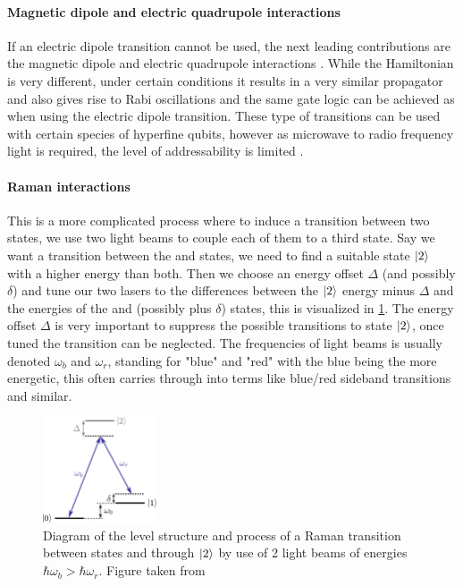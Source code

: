 \paragraph{Magnetic dipole and electric quadrupole interactions}
If an electric dipole transition cannot be used, the next leading contributions are the magnetic dipole and electric quadrupole interactions \cite{schaferFastGatesMixedSpecies2020}.
While the Hamiltonian is very different, under certain conditions it results in a very similar propagator and also gives rise to Rabi oscillations and the same gate logic can be achieved as when using the electric dipole transition.
These type of transitions can be used with certain species of hyperfine qubits, however as microwave to radio frequency light is required, the level of addressability is limited \cite{bruzewiczTrappedionQuantumComputing2019}.

\paragraph{Raman interactions}
This is a more complicated process where to induce a transition between two states, we use two light beams to couple each of them to a third state.
Say we want a transition between the \kz and \ko states, we need to find a suitable state $\ket{2}$ with a higher energy than both.
Then we choose an energy offset $\Delta$ (and possibly $\delta$) and tune our two lasers to the differences between the $\ket{2}$ energy minus $\Delta$ and the energies of the \kz and \ko (possibly plus $\delta$) states, this is visualized in \cref{fig:TIQC_raman}.
The energy offset $\Delta$ is very important to suppress the possible transitions to state $\ket{2}$, once tuned the transition can be neglected.
The frequencies of light beams is usually denoted $\omega_b$ and $\omega_r$, standing for "blue" and "red" with the blue being the more energetic, this often carries through into terms like blue/red sideband transitions and similar.

\begin{figure}[H]
    \centering
    \includegraphics[width=0.3\textwidth]{images/TIQC_raman.jpg}
    \caption{Diagram of the level structure and process of a Raman transition between states \kz and \ko through $\ket{2}$ by use of 2 light beams of energies $\hbar \omega_b > \hbar \omega_r$. Figure taken from \cite{schaferFastGatesMixedSpecies2020}}\label{fig:TIQC_raman}
\end{figure}


